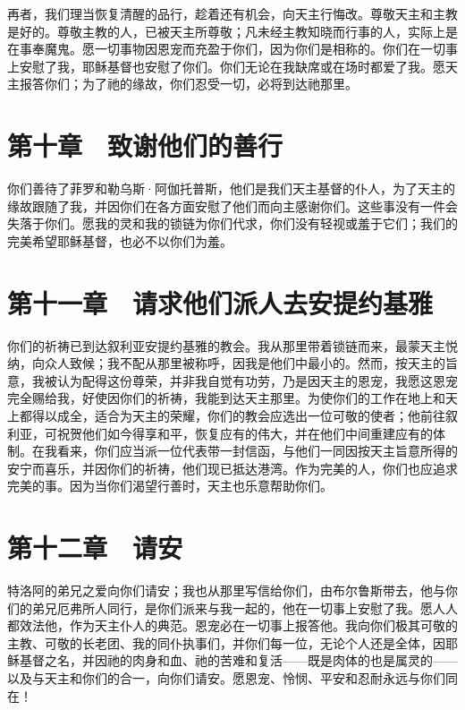 再者，我们理当恢复清醒的品行，趁着还有机会，向天主行悔改。尊敬天主和主教是好的。尊敬主教的人，已被天主所尊敬；凡未经主教知晓而行事的人，实际上是在事奉魔鬼。愿一切事物因恩宠而充盈于你们，因为你们是相称的。你们在一切事上安慰了我，耶稣基督也安慰了你们。你们无论在我缺席或在场时都爱了我。愿天主报答你们；为了祂的缘故，你们忍受一切，必将到达祂那里。\par


\section{第十章　致谢他们的善行}

你们善待了菲罗和勒乌斯·阿伽托普斯，他们是我们天主基督的仆人，为了天主的缘故跟随了我，并因你们在各方面安慰了他们而向主感谢你们。这些事没有一件会失落于你们。愿我的灵和我的锁链为你们代求，你们没有轻视或羞于它们；我们的完美希望耶稣基督，也必不以你们为羞。\par


\section{第十一章　请求他们派人去安提约基雅}

你们的祈祷已到达叙利亚安提约基雅的教会。我从那里带着锁链而来，最蒙天主悦纳，向众人致候；我不配从那里被称呼，因我是他们中最小的。然而，按天主的旨意，我被认为配得这份尊荣，并非我自觉有功劳，乃是因天主的恩宠，我愿这恩宠完全赐给我，好使因你们的祈祷，我能到达天主那里。为使你们的工作在地上和天上都得以成全，适合为天主的荣耀，你们的教会应选出一位可敬的使者；他前往叙利亚，可祝贺他们如今得享和平，恢复应有的伟大，并在他们中间重建应有的体制。在我看来，你们应当派一位代表带一封信函，与他们一同因按天主旨意所得的安宁而喜乐，并因你们的祈祷，他们现已抵达港湾。作为完美的人，你们也应追求完美的事。因为当你们渴望行善时，天主也乐意帮助你们。\par


\section{第十二章　请安}

特洛阿的弟兄之爱向你们请安；我也从那里写信给你们，由布尔鲁斯带去，他与你们的弟兄厄弗所人同行，是你们派来与我一起的，他在一切事上安慰了我。愿人人都效法他，作为天主仆人的典范。恩宠必在一切事上报答他。我向你们极其可敬的主教、可敬的长老团、我的同仆执事们，并你们每一位，无论个人还是全体，因耶稣基督之名，并因祂的肉身和血、祂的苦难和复活——既是肉体的也是属灵的——以及与天主和你们的合一，向你们请安。愿恩宠、怜悯、平安和忍耐永远与你们同在！\par

